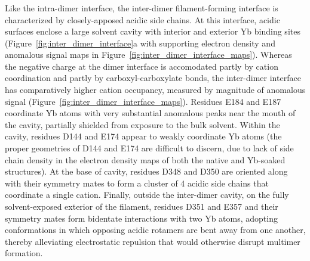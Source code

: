 \subsubsection{\headingsubsubsectionfive}
% 
Like the intra-dimer interface, the inter-dimer filament-forming interface is characterized by closely-apposed acidic side chains. At this interface, acidic surfaces enclose a large solvent cavity with interior and exterior Yb binding sites (Figure~\ref{fig:inter_dimer_interface}a with supporting electron density and anomalous signal maps in Figure~\ref{fig:inter_dimer_interface_maps}). Whereas the negative charge at the dimer interface is accomodated partly by cation coordination and partly by carboxyl-carboxylate bonds, the inter-dimer interface has comparatively higher cation occupancy, measured by magnitude of anomalous signal (Figure~\ref{fig:inter_dimer_interface_maps}). Residues E184 and E187 coordinate Yb atoms with very substantial anomalous peaks near the mouth of the cavity, partially shielded from exposure to the bulk solvent. Within the cavity, residues D144 and E174 appear to weakly coordinate Yb atoms  (the proper geometries of D144 and E174 are difficult to discern, due to lack of side chain density in the electron density maps of both the native and Yb-soaked structures). At the base of cavity, residues D348 and D350 are oriented along with their symmetry mates to form a cluster of 4 acidic side chains that coordinate a single cation. Finally, outside the inter-dimer cavity, on the fully solvent-exposed exterior of the filament, residues D351 and E357 and their symmetry mates form bidentate interactions with two Yb atoms, adopting conformations in which opposing acidic rotamers are bent away from one another, thereby alleviating electrostatic repulsion that would otherwise disrupt multimer formation.

